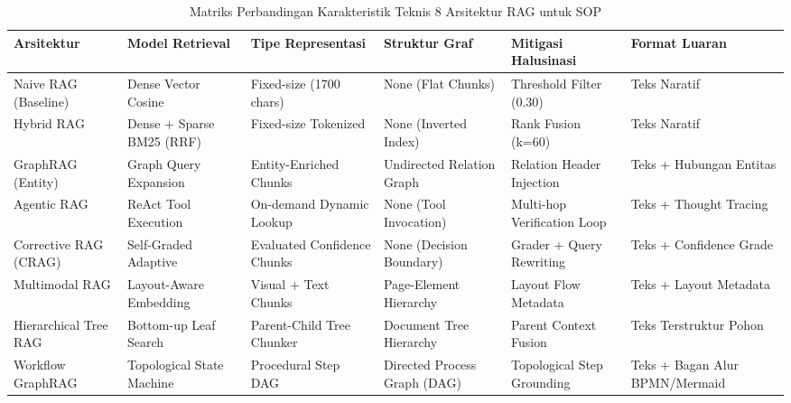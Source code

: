 \begin{table}
\caption{Matriks Perbandingan Karakteristik Teknis 8 Arsitektur RAG untuk SOP}
\label{tab:rag_qualitative_matrix}
\begin{tabular}{lp{3cm}p{3cm}p{3cm}p{3cm}p{3cm}}
\toprule
Arsitektur & Model Retrieval & Tipe Representasi & Struktur Graf & Mitigasi Halusinasi & Format Luaran \\
\midrule
Naive RAG (Baseline) & Dense Vector Cosine & Fixed-size (1700 chars) & None (Flat Chunks) & Threshold Filter (0.30) & Teks Naratif \\
Hybrid RAG & Dense + Sparse BM25 (RRF) & Fixed-size Tokenized & None (Inverted Index) & Rank Fusion (k=60) & Teks Naratif \\
GraphRAG (Entity) & Graph Query Expansion & Entity-Enriched Chunks & Undirected Relation Graph & Relation Header Injection & Teks + Hubungan Entitas \\
Agentic RAG & ReAct Tool Execution & On-demand Dynamic Lookup & None (Tool Invocation) & Multi-hop Verification Loop & Teks + Thought Tracing \\
Corrective RAG (CRAG) & Self-Graded Adaptive & Evaluated Confidence Chunks & None (Decision Boundary) & Grader + Query Rewriting & Teks + Confidence Grade \\
Multimodal RAG & Layout-Aware Embedding & Visual + Text Chunks & Page-Element Hierarchy & Layout Flow Metadata & Teks + Layout Metadata \\
Hierarchical Tree RAG & Bottom-up Leaf Search & Parent-Child Tree Chunker & Document Tree Hierarchy & Parent Context Fusion & Teks Terstruktur Pohon \\
Workflow GraphRAG & Topological State Machine & Procedural Step DAG & Directed Process Graph (DAG) & Topological Step Grounding & Teks + Bagan Alur BPMN/Mermaid \\
\bottomrule
\end{tabular}
\end{table}
